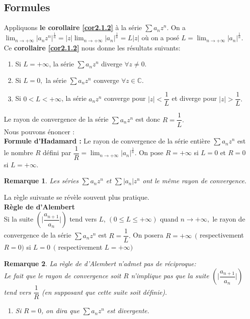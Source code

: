 \documentclass[11pt, a4paper]{book}
\newtheorem{rem}{Remarque}[section]
\begin{document}
\subsection{Formules}
Appliquons \textbf{le corollaire \ref{cor2.1.2}} \`a la s\'erie $\sum a_n z^n.$ On a ${\displaystyle\lim_{n\rightarrow+\infty}|a_nz^n|^{\frac{1}{n}}=|z|\lim_{n\rightarrow+\infty}|a_n|^{\frac{1}{n}}=L|z|}$ o\`u on a pos\'e ${\displaystyle L=\lim_{n\rightarrow+\infty}|a_n|^{\frac{1}{n}}}$. \\ Ce \textbf{corollaire \ref{cor2.1.2}} nous donne les r\'esultats suivants:
\begin{enumerate}
\item Si $L=+\infty$, la s\'erie $\sum a_n z^n$ diverge $\forall z\neq0.$
\item Si $L=0,$ la s\'erie $\sum a_nz^n$ converge $\forall z\in \mathbb{C}.$
\item Si $0<L<+\infty$, la s\'erie $a_nz^n$ converge pour $|z|<\dfrac{1}{L}$ et diverge pour $|z|>\dfrac{1}{L}.$
\end{enumerate}
Le rayon de convergence de la s\'erie $\sum a_nz^n$ est donc $R=\dfrac{1}{L}.$\\
 Nous pouvons \'enoncer : \\
\textbf{Formule d'Hadamard :} Le rayon de convergence de la s\'erie enti\`ere $\sum a_nz^n$ est le nombre $R$ d\'efini par ${\displaystyle\dfrac{1}{R}=\lim_{n\rightarrow+\infty}|a_n|^\frac{1}{n}.}$ On pose $R=+\infty$ si $L=0$ et $R=0$ si $L=+\infty$.
\begin{rem} Les s\'eries $\sum a_nz^n$ et $\sum |a_n|z^n$ ont le m\^eme rayon de convergence.\end{rem}
La r\`egle suivante se r\'ev\`ele souvent plus pratique.\\
\textbf{R\`egle de d'Alembert }\\
Si la suite $\left(\Big|\dfrac{a_{n+1}}{a_n}\Big|\right)$ tend vers $L$, $(0\leq L\leq +\infty)$ quand $n\rightarrow+\infty,$ le rayon de convergence de la s\'erie $\sum a_nz^n$ est $R=\dfrac{1}{L}.$ On posera $R=+\infty~~($ respectivement $R=0)$ si $L=0~~($ respectivement $L=+\infty)$ 
\begin{rem} La r\`egle de d'Alembert n'admet pas de r\'eciproque: \\ Le fait que le rayon de convergence soit $R$ n'implique pas que la suite $\left(\Big|\dfrac{a_{n+1}}{a_n}\Big|\right)$ tend vers $\dfrac{1}{R}$ (en supposant que cette suite soit d\'efinie).
\begin{enumerate}
\item[$\cdot$] Si $R=0$, on dira que $\sum a_n z^n$ est divergente.
\end{enumerate}
\end{rem}
\end{document}
